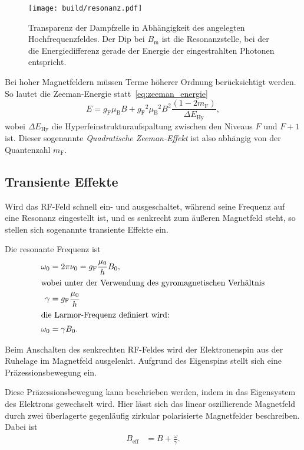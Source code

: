 \begin{figure}[ht]
  \centering
  \texttt{[image: build/resonanz.pdf]}
  \caption{%
    Transparenz der Dampfzelle in Abhängigkeit des angelegten
    Hochfrequenzfeldes.\cite{anleitung}
    Der Dip bei $B_\text{m}$ ist die Resonanzstelle, bei der die
    Energiedifferenz gerade der Energie der eingestrahlten Photonen entspricht.
  }%
  \label{fig:resonanz}
\end{figure}


Bei hoher Magnetfeldern müssen Terme höherer Ordnung berücksichtigt werden.
So lautet die Zeeman-Energie statt~\eqref{eq:zeeman_energie}
\begin{equation}
  E = g_\text{F} \mu_\text{B} B + {g_\text{F}}^2 {\mu_\text{B}}^2 {B}^2 \frac{\left(1
  - 2 m_\text{F} \right)}{\Delta E_\text{Hy}},
\end{equation}
wobei $\Delta E_\text{Hy}$ die Hyperfeinstrukturaufspaltung zwischen den
Niveaus $F$ und $F + 1$ ist.
Dieser sogenannte \textit{Quadratische Zeeman-Effekt} ist also abhängig von
der Quantenzahl $m_\text{F}$.


\subsection{Transiente Effekte}%
\label{sub:transiente_effekte}

Wird das RF-Feld schnell ein- und ausgeschaltet, während seine Frequenz auf eine
Resonanz eingestellt ist, und es senkrecht zum äußeren Magnetfeld steht,
so stellen sich sogenannte transiente Effekte ein.

Die resonante Frequenz ist
\begin{align}
  \omega_0 &= 2 \pi \nu_0 = g_\text{F} \frac{\mu_0}{h} B_0, \\
  \intertext{wobei unter der Verwendung des gyromagnetischen Verhältnis}
  \gamma &= g_\text{F} \frac{\mu_0}{h} \\
  \intertext{die Larmor-Frequenz definiert wird:}
  \omega_0 &= \gamma B_0.
\end{align}

Beim Anschalten des senkrechten RF-Feldes wird der Elektronenspin aus der
Ruhelage im Magnetfeld ausgelenkt.
Aufgrund des Eigenspins stellt sich eine Präzessionsbewegung ein.

Diese Präzessionsbewegung kann beschrieben werden, indem in das Eigensystem des
Elektrons gewechselt wird.
Hier lässt sich das linear oszillierende Magnetfeld durch zwei überlagerte
gegenläufig zirkular polarisierte Magnetfelder beschreiben.
Dabei ist
\begin{align}
  B_\text{eff} &= B + \frac{\omega}{\gamma}.
\end{align}

